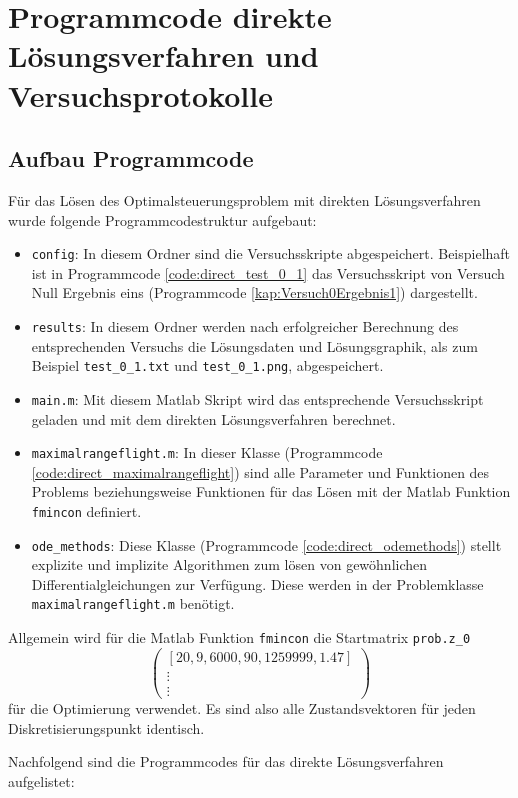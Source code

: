 \chapter{Programmcode direkte Lösungsverfahren und Versuchsprotokolle}

\section{Aufbau Programmcode}
Für das Lösen des Optimalsteuerungsproblem mit direkten Lösungsverfahren wurde folgende Programmcodestruktur aufgebaut:
\begin{itemize}
\item \texttt{config}: In diesem Ordner sind die Versuchsskripte abgespeichert. Beispielhaft ist in Programmcode \ref{code:direct_test_0_1} das Versuchsskript von Versuch Null Ergebnis eins (Programmcode \ref{kap:Versuch0Ergebnis1}) dargestellt.
%
\item \texttt{results}: In diesem Ordner werden nach erfolgreicher Berechnung des entsprechenden Versuchs die Lösungsdaten und Lösungsgraphik, als zum Beispiel \texttt{test\_0\_1.txt} und \texttt{test\_0\_1.png}, abgespeichert.
\item \texttt{main.m}: Mit diesem Matlab Skript wird das entsprechende Versuchsskript geladen und mit dem direkten Lösungsverfahren berechnet.
%
\item \texttt{maximalrangeflight.m}: In dieser Klasse (Programmcode \ref{code:direct_maximalrangeflight}) sind alle Parameter und Funktionen des Problems beziehungsweise Funktionen für das Lösen mit der Matlab Funktion \texttt{fmincon} definiert. 
%
\item \texttt{ode\_methods}: Diese Klasse (Programmcode \ref{code:direct_odemethods}) stellt explizite und implizite Algorithmen zum lösen von gewöhnlichen Differentialgleichungen zur Verfügung. Diese werden in der Problemklasse \texttt{maximalrangeflight.m} benötigt.
\end{itemize}

Allgemein wird für die Matlab Funktion \verb|fmincon| die Startmatrix  \verb|prob.z_0| 
\[\begin{pmatrix}
[20,9,6000,90,1259999,1.47] \\ 
\vdots \\ 
\vdots
\end{pmatrix}\]
für die Optimierung verwendet. Es sind also alle Zustandsvektoren für jeden Diskretisierungspunkt identisch.

Nachfolgend sind die Programmcodes für das direkte Lösungsverfahren aufgelistet:

